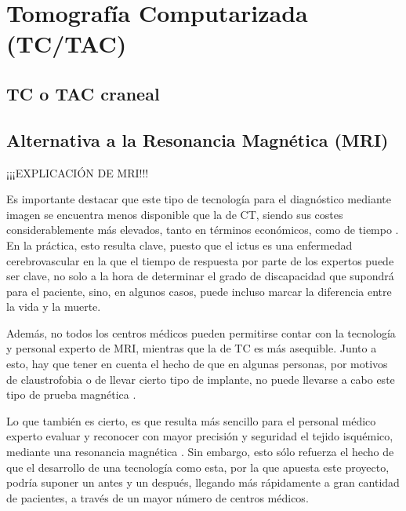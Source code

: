 \section{Tomografía Computarizada (TC/TAC)}




\subsection{TC o TAC craneal}





\subsection{Alternativa a la Resonancia Magnética (MRI)}

¡¡¡EXPLICACIÓN DE MRI!!!

Es importante destacar que este tipo de tecnología para el diagnóstico mediante imagen se encuentra menos disponible que la de CT, siendo sus costes considerablemente más elevados, tanto en términos económicos, como de tiempo \cite{MRIvsTC}. En la práctica, esto resulta clave, puesto que el ictus es una enfermedad cerebrovascular en la que el tiempo de respuesta por parte de los expertos puede ser clave, no solo a la hora de determinar el grado de discapacidad que supondrá para el paciente, sino, en algunos casos, puede incluso marcar la diferencia entre la vida y la muerte. 

Además, no todos los centros médicos pueden permitirse contar con la tecnología y personal experto de MRI, mientras que la de TC es más asequible. Junto a esto, hay que tener en cuenta el hecho de que en algunas personas, por motivos de claustrofobia o de llevar cierto tipo de implante, no puede llevarse a cabo este tipo de prueba magnética  \cite{MRIvsTC}.

Lo que también es cierto, es que resulta más sencillo para el personal médico experto evaluar y reconocer con mayor precisión y seguridad el tejido isquémico, mediante una resonancia magnética \cite{MRIvsTC}. Sin embargo, esto sólo refuerza el hecho de que el desarrollo de una tecnología como esta, por la que apuesta este proyecto, podría suponer un antes y un después, llegando más rápidamente a gran cantidad de pacientes, a través de un mayor número de centros médicos.



